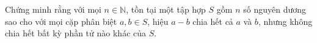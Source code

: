 \ifshowproblem
\begin{problem}\label{example:USA-2015-TST-P2}
    Chứng minh rằng với mọi \( n \in \mathbb{N} \), tồn tại một tập hợp \( S \) gồm \( n \) số nguyên dương
    sao cho với mọi cặp phân biệt \( a, b \in S \), hiệu \( a - b \) chia hết cả \( a \) và \( b \),
    nhưng không chia hết bất kỳ phần tử nào khác của \( S \).
\end{problem}
\fi

\footnotemark
{}
\fi